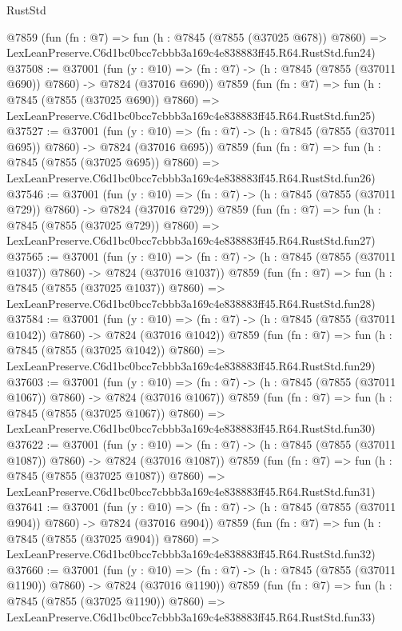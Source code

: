 \begin{lexlean}{RustStd}
\begin{coremodule}
    @7859
    (fun (fn : @7) =>
    fun (h : @7845 (@7855 (@37025 @678)) @7860) =>
    LexLeanPreserve.C6d1bc0bcc7cbbb3a169c4e838883ff45.R64.RustStd.fun24)
@37508 := @37001
    (fun (y : @10) => (fn : @7) -> (h : @7845 (@7855 (@37011 @690)) @7860) -> @7824 (@37016 @690))
    @7859
    (fun (fn : @7) =>
    fun (h : @7845 (@7855 (@37025 @690)) @7860) =>
    LexLeanPreserve.C6d1bc0bcc7cbbb3a169c4e838883ff45.R64.RustStd.fun25)
@37527 := @37001
    (fun (y : @10) => (fn : @7) -> (h : @7845 (@7855 (@37011 @695)) @7860) -> @7824 (@37016 @695))
    @7859
    (fun (fn : @7) =>
    fun (h : @7845 (@7855 (@37025 @695)) @7860) =>
    LexLeanPreserve.C6d1bc0bcc7cbbb3a169c4e838883ff45.R64.RustStd.fun26)
@37546 := @37001
    (fun (y : @10) => (fn : @7) -> (h : @7845 (@7855 (@37011 @729)) @7860) -> @7824 (@37016 @729))
    @7859
    (fun (fn : @7) =>
    fun (h : @7845 (@7855 (@37025 @729)) @7860) =>
    LexLeanPreserve.C6d1bc0bcc7cbbb3a169c4e838883ff45.R64.RustStd.fun27)
@37565 := @37001
    (fun (y : @10) => (fn : @7) -> (h : @7845 (@7855 (@37011 @1037)) @7860) -> @7824 (@37016 @1037))
    @7859
    (fun (fn : @7) =>
    fun (h : @7845 (@7855 (@37025 @1037)) @7860) =>
    LexLeanPreserve.C6d1bc0bcc7cbbb3a169c4e838883ff45.R64.RustStd.fun28)
@37584 := @37001
    (fun (y : @10) => (fn : @7) -> (h : @7845 (@7855 (@37011 @1042)) @7860) -> @7824 (@37016 @1042))
    @7859
    (fun (fn : @7) =>
    fun (h : @7845 (@7855 (@37025 @1042)) @7860) =>
    LexLeanPreserve.C6d1bc0bcc7cbbb3a169c4e838883ff45.R64.RustStd.fun29)
@37603 := @37001
    (fun (y : @10) => (fn : @7) -> (h : @7845 (@7855 (@37011 @1067)) @7860) -> @7824 (@37016 @1067))
    @7859
    (fun (fn : @7) =>
    fun (h : @7845 (@7855 (@37025 @1067)) @7860) =>
    LexLeanPreserve.C6d1bc0bcc7cbbb3a169c4e838883ff45.R64.RustStd.fun30)
@37622 := @37001
    (fun (y : @10) => (fn : @7) -> (h : @7845 (@7855 (@37011 @1087)) @7860) -> @7824 (@37016 @1087))
    @7859
    (fun (fn : @7) =>
    fun (h : @7845 (@7855 (@37025 @1087)) @7860) =>
    LexLeanPreserve.C6d1bc0bcc7cbbb3a169c4e838883ff45.R64.RustStd.fun31)
@37641 := @37001
    (fun (y : @10) => (fn : @7) -> (h : @7845 (@7855 (@37011 @904)) @7860) -> @7824 (@37016 @904))
    @7859
    (fun (fn : @7) =>
    fun (h : @7845 (@7855 (@37025 @904)) @7860) =>
    LexLeanPreserve.C6d1bc0bcc7cbbb3a169c4e838883ff45.R64.RustStd.fun32)
@37660 := @37001
    (fun (y : @10) => (fn : @7) -> (h : @7845 (@7855 (@37011 @1190)) @7860) -> @7824 (@37016 @1190))
    @7859
    (fun (fn : @7) =>
    fun (h : @7845 (@7855 (@37025 @1190)) @7860) =>
    LexLeanPreserve.C6d1bc0bcc7cbbb3a169c4e838883ff45.R64.RustStd.fun33)

\end{coremodule}
\end{lexlean}
